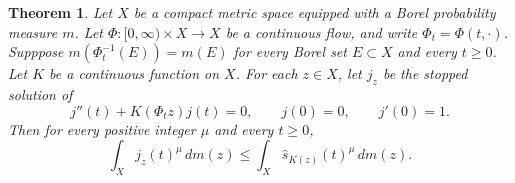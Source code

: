 \documentclass[10pt,a4paper]{amsart}
\newtheorem{theorem}{Theorem}
\begin{document}
\begin{theorem} \label{thm:continuum-shuffle}
Let $X$ be a compact metric space equipped with a Borel probability measure $m$. Let $\Phi:[0, \infty)\times X\longrightarrow X$ be a continuous flow, and write $\Phi_t=\Phi(t, \cdot)$. Supppose $m(\Phi_t^{-1}(E))=m(E)$ for every Borel set $E\subset X$ and every $t\ge 0$. Let $K$ be a continuous function on $X$. For each $z\in X$, let $j_z$ be the stopped solution of
\begin{equation*}\label{eq:flow-jacobi}
j''(t)+K(\Phi_tz)j(t)=0, \qquad j(0)=0, \qquad j'(0)=1.
\end{equation*}
Then for every positive integer $\mu$ and every $t\ge 0$,
\begin{equation*}\label{eq:continuum-shuffle}
\int_Xj_z(t)^\mu\, dm(z) \le \int_X\widehat s_{K(z)}(t)^\mu\, dm(z).
\end{equation*}
\end{theorem}
\end{document}
